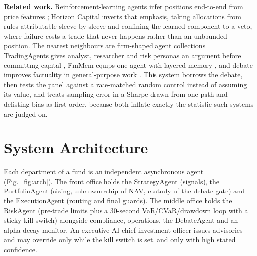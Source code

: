 \documentclass[conference]{IEEEtran}
\begin{document}
\textbf{Related work.} Reinforcement-learning agents infer positions end-to-end
from price features \cite{liu2020finrl}; Horizon Capital inverts that emphasis,
taking allocations from rules attributable sleeve by sleeve and confining the
learned component to a veto, where failure costs a trade that never happens
rather than an unbounded position. The nearest neighbours are firm-shaped agent
collections: TradingAgents gives analyst, researcher and risk personas an
argument before committing capital \cite{xiao2024tradingagents}, FinMem equips
one agent with layered memory \cite{yu2023finmem}, and debate improves
factuality in general-purpose work \cite{du2023improving}. This system borrows
the debate, then tests the panel against a rate-matched random control instead
of assuming its value, and treats sampling error in a Sharpe drawn from one
path \cite{lo2002statistics} and delisting bias \cite{shumway1997delisting} as
first-order, because both inflate exactly the statistic such systems are judged
on.

\section{System Architecture}

Each department of a fund is an independent asynchronous agent
(Fig.~\ref{fig:arch}). The front office holds the StrategyAgent (signals), the
PortfolioAgent (sizing, sole ownership of NAV, custody of the debate gate) and
the ExecutionAgent (routing and final guards). The middle office holds the
RiskAgent (pre-trade limits plus a 30-second VaR/CVaR/drawdown loop with a
sticky kill switch) alongside compliance, operations, the DebateAgent and an
alpha-decay monitor. An executive AI chief investment officer issues advisories
and may override only while the kill switch is set, and only with high stated
confidence.
\end{document}
